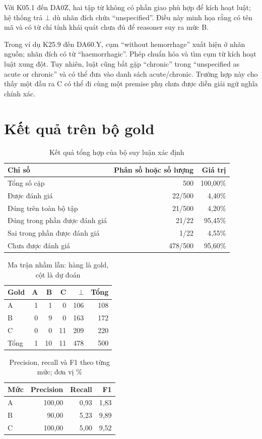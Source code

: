 Với K05.1 đến DA0Z, hai tập từ không có phần giao phù hợp để kích hoạt
luật; hệ thống trả $\bot$ dù nhãn đích chứa “unspecified”.
Điều này minh họa rằng có tên mã và có từ chỉ tính khái quát chưa đủ
để reasoner suy ra mức B.

Trong ví dụ K25.9 đến DA60.Y, cụm “without hemorrhage” xuất hiện
ở nhãn nguồn; nhãn đích có từ “haemorrhagic”.
Phép chuẩn hóa và tìm cụm từ kích hoạt luật xung đột.
Tuy nhiên, luật cũng bắt gặp “chronic” trong
“unspecified as acute or chronic” và có thể đưa vào danh sách
acute/chronic. Trường hợp này cho thấy một đầu ra C có thể đi cùng
một premise phụ chưa được diễn giải ngữ nghĩa chính xác.

\section{Kết quả trên bộ gold}
\begin{table}[htbp]
\centering
\caption{Kết quả tổng hợp của bộ suy luận xác định}\label{tab:metrics}
\begin{tabular}{lrr}
\toprule
Chỉ số & Phân số hoặc số lượng & Giá trị\\
\midrule
Tổng số cặp & 500 & 100,00\%\\
Được đánh giá & 22/500 & 4,40\%\\
Đúng trên toàn bộ tập & 21/500 & 4,20\%\\
Đúng trong phần được đánh giá & 21/22 & 95,45\%\\
Sai trong phần được đánh giá & 1/22 & 4,55\%\\
Chưa được đánh giá & 478/500 & 95,60\%\\
\bottomrule
\end{tabular}
\end{table}

\begin{table}[htbp]
\centering
\caption{Ma trận nhầm lẫn: hàng là gold, cột là dự đoán}\label{tab:confusion}
\begin{tabular}{lrrrrr}
\toprule
Gold & A & B & C & $\bot$ & Tổng\\
\midrule
A & 1 & 1 & 0 & 106 & 108\\
B & 0 & 9 & 0 & 163 & 172\\
C & 0 & 0 & 11 & 209 & 220\\
\midrule
Tổng & 1 & 10 & 11 & 478 & 500\\
\bottomrule
\end{tabular}
\end{table}

\begin{table}[htbp]
\centering
\caption{Precision, recall và F1 theo từng mức; đơn vị \%}\label{tab:perlevel}
\begin{tabular}{lrrr}
\toprule
Mức & Precision & Recall & F1\\
\midrule
A & 100,00 & 0,93 & 1,83\\
B & 90,00 & 5,23 & 9,89\\
C & 100,00 & 5,00 & 9,52\\
\bottomrule
\end{tabular}
\end{table}

